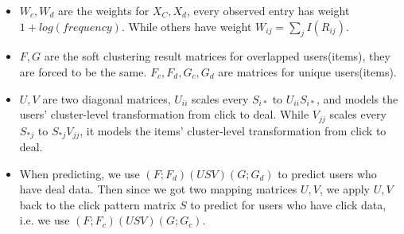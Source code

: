   \par{
    \begin{itemize}
    \item $W_c,W_d$ are the weights for $X_C, X_d$, every observed entry has weight $1 + log(frequency)$. While others have weight $W_{ij} = \sum_jI({R_{ij}})$.
    \item $F, G$ are the soft clustering result matrices for overlapped users(items), they are forced to be the same. $F_c,F_d,G_c,G_d$ are matrices for unique users(items).
    \item $U,V$ are two diagonal matrices, $U_{ii}$ scales every $S_{i*}$ to $U_{ii}S_{i*}$, and models the users' cluster-level transformation from click to deal. While $V_{jj}$ scales every $S_{*j}$ to $S_{*j}V_{jj}$, it models the items' cluster-level transformation from click to deal.
    \item When predicting, we use $(F;F_d)(USV)(G;G_d)$ to predict users who have deal data. Then since we got two mapping matrices $U,V$, we apply $U,V$ back to the click pattern matrix $S$ to predict for users who have click data, i.e. we use $(F;F_c)(USV)(G;G_c)$.
    \end{itemize}
}



